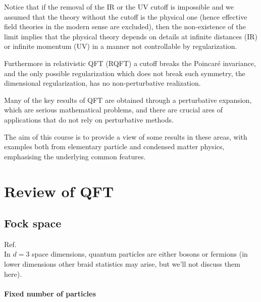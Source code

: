 \documentclass[../main/main.tex]{subfiles}
\begin{document}
Notice that if the removal of the IR or the UV cutoff is impossible and we assumed that the theory without the cutoff is the physical one (hence effective field theories in the modern sense are excluded), then the non-existence of the limit implies that the physical theory depends on details at infinite distances (IR) or infinite momentum (UV) in a manner not controllable by regularization. 

Furthermore in relativistic QFT (RQFT) a cutoff breaks the Poincaré invariance, and the only possible regularization which does not break such symmetry, the dimensional regularization, has no non-perturbative realization. 

Many of the key results of QFT are obtained through a perturbative expansion, which are serious mathematical problems, and there are crucial ares of applications that do not rely on perturbative methods. 

The aim of this course is to provide a view of some results in these areas, with examples both from elementary particle and condensed matter physics, emphasising the underlying common features. 

\chapter{Review of QFT}
\section{Fock space}

\textsf{Ref.~\cite[Chapters 3,4]{Greiner_1996}}\\

In $d=3$ space dimensions, quantum particles are either bosons or fermions (in lower dimensions other braid statistics may arise, but we'll not discuss them here). 

\subsubsection{Fixed number of particles}
\end{document}
